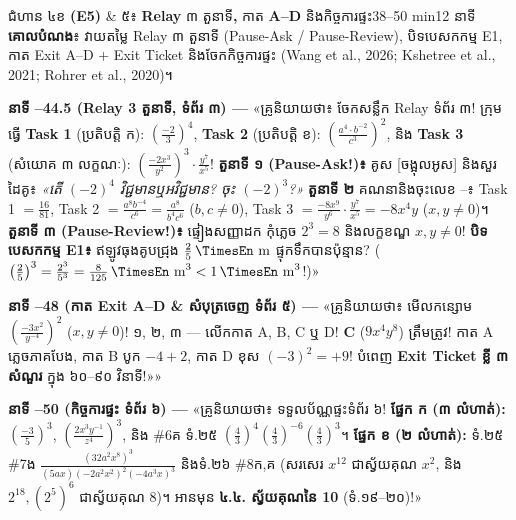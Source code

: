 \documentclass[a4paper,12pt]{article}
\newcommand{\en}[1]{{\TimesEn #1}}
\newcommand{\enbf}[1]{{\TimesEn\textbf{#1}}}
\newcommand{\unit}[1]{\,\text{\en{#1}}}
\newcommand{\cnum}[1]{{\TimesEn\fontsize{10.5pt}{12pt}\selectfont\ding{\numexpr181+#1\relax}}}
\newcommand{\teachersays}[1]{{\muol\fontsize{10.8pt}{17pt}\selectfont «គ្រូនិយាយថា៖} #1»}
\begin{document}
\Needspace{2.0cm}
\begin{phasebox}{ជំហាន ៤ខ \enbf{(E5)} \& ៥៖ \enbf{Relay} ៣ តួនាទី\enbf{,} កាត \enbf{A--D} និងកិច្ចការផ្ទះ}{38--50 min}{12 នាទី}
\textbf{គោលបំណង}៖ វាយតម្លៃ \en{Relay} ៣ តួនាទី (\en{Pause-Ask / Pause-Review}), បិទបេសកកម្ម \en{E1}, កាត \en{Exit A--D} + \en{Exit Ticket} និងចែកកិច្ចការផ្ទះ \en{(Wang et al., 2026; Kshetree et al., 2021; Rohrer et al., 2020)}។
\end{phasebox}
\begin{scriptbox}
  \textbf{នាទី \en{38--44.5} (\en{Relay 3} តួនាទី, ទំព័រ ៣) — }\teachersays{ចែកសន្លឹក \en{Relay} ទំព័រ ៣! ក្រុមធ្វើ \textbf{Task 1} (ប្រតិបត្តិ ក): $\left(\frac{-2}{3}\right)^4$, \textbf{Task 2} (ប្រតិបត្តិ ខ): $\left(\frac{a^4\cdot b^{-2}}{c^3}\right)^2$, និង \textbf{Task 3} (សំយោគ ៣ លក្ខណៈ): $\left(\frac{-2x^3}{y^2}\right)^3\cdot\frac{y^7}{x^5}$! \textbf{តួនាទី ១ (\en{Pause-Ask!})៖} គូស [ចង្អុលអូស] និងសួរដៃគូ៖ \textit{«តើ $(-2)^4$ វិជ្ជមានឬអវិជ្ជមាន? ចុះ $(-2)^3$?»} \textbf{តួនាទី ២} គណនានិងចុះលេខ \cnum{1}--\cnum{5}៖ Task 1 $=\frac{16}{81}$, Task 2 $=\frac{a^8b^{-4}}{c^6}=\frac{a^8}{b^4c^6}$ ($b,c\neq 0$), Task 3 $=\frac{-8x^9}{y^6}\cdot\frac{y^7}{x^5}=-8x^4y$ ($x,y\neq 0$)។ \textbf{តួនាទី ៣ (\en{Pause-Review!})៖} ផ្ទៀងសញ្ញាដក កុំភ្លេច $2^3=8$ និងលក្ខខណ្ឌ $x,y\neq 0$! \textbf{បិទបេសកកម្ម \en{E1}៖} ឥឡូវធុងគូបជ្រុង $\frac{2}{5}\unit{m}$ ផ្ទុកទឹកបានប៉ុន្មាន? ($\left(\frac{2}{5}\right)^3 = \frac{2^3}{5^3} = \frac{8}{125}\unit{m}^3 < 1\unit{m}^3$!)}\par\vspace{3pt}
  \textbf{នាទី \en{44.5--48} (កាត \en{Exit A--D} \& សំបុត្រចេញ ទំព័រ ៥) — }\teachersays{មើលកន្សោម $\left(\frac{-3x^2}{y^{-4}}\right)^2$ ($x,y\neq 0$)! ១, ២, ៣ — លើកកាត \en{A, B, C} ឬ \en{D}! \textbf{C} ($9x^4y^8$) ត្រឹមត្រូវ! កាត \en{A} ភ្លេចភាគបែង, កាត \en{B} បូក $-4+2$, កាត \en{D} ខុស $(-3)^2=+9$! បំពេញ \textbf{Exit Ticket ខ្លី ៣ សំណួរ} ក្នុង ៦០--៩០ វិនាទី!»}\par\vspace{3pt}
  \textbf{នាទី \en{48--50} (កិច្ចការផ្ទះ ទំព័រ ៦) — }\teachersays{ទទួលប័ណ្ណផ្ទះទំព័រ ៦! \textbf{ផ្នែក ក (៣ លំហាត់):} $\left(\frac{-3}{5}\right)^3$, $\left(\frac{2x^3y^{-1}}{z^4}\right)^3$, និង \en{\#6}គ ទំ.២៥ $\left(\frac{4}{3}\right)^4\left(\frac{4}{3}\right)^{-6}\left(\frac{4}{3}\right)^3$។ \textbf{ផ្នែក ខ (២ លំហាត់):} ទំ.២៥ \en{\#7}ង $\frac{(32a^2x^8)^3}{(5ax)(-2a^2x^2)^2(-4a^3x)^3}$ និងទំ.២៦ \en{\#8}ក,គ (សរសេរ $x^{12}$ ជាស្វ័យគុណ $x^2$, និង $2^{18}, (2^5)^6$ ជាស្វ័យគុណ $8$)។ អានមុន \textbf{៤.៤. ស្វ័យគុណនៃ 10} (ទំ.១៩--២០)!}
\end{scriptbox}
\end{document}
